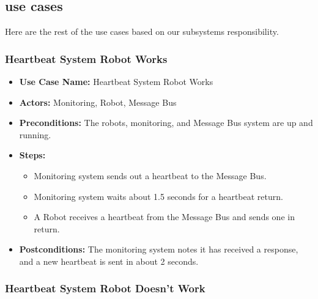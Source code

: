 \subsection{use cases}
\label{sec:apusecase}
Here are the rest of the use cases based on our subsystems responsibility. 
\vspace{1em}

\subsubsection{Heartbeat System Robot Works}
\label{sec:heartbeat-works}

\begin{itemize}
    \item \textbf{Use Case Name:} Heartbeat System Robot Works
    \item \textbf{Actors:} Monitoring, Robot, Message Bus
    \item \textbf{Preconditions:} The robots, monitoring, and Message Bus system are up and running.
    \item \textbf{Steps:}
    \begin{itemize}[label=--]
        \item Monitoring system sends out a heartbeat to the Message Bus.
        \item Monitoring system waits about 1.5 seconds for a heartbeat return. 
        \item A Robot receives a heartbeat from the Message Bus and sends one in return. 
    \end{itemize}
    \item \textbf{Postconditions:} The monitoring system notes it has received a response, and a new heartbeat is sent in about 2 seconds.
\end{itemize}
\vspace{1em}

\subsubsection{Heartbeat System Robot Doesn't Work}
\label{sec:heartbeat-doesnt-work}

